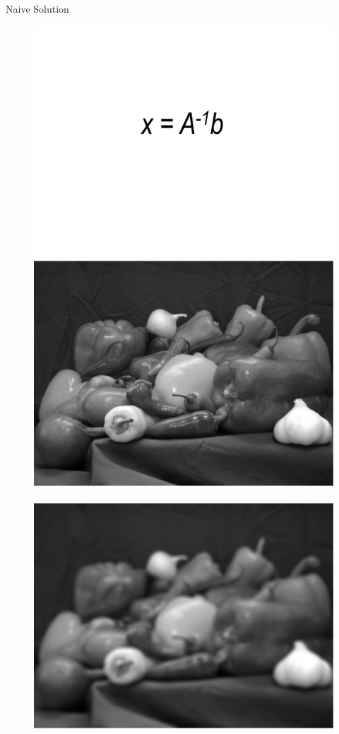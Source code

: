 \documentclass[12pt]{beamer}
\begin{document}
\begin{frame}{Naive Solution}
\begin{figure}
\centering
\includegraphics[scale=0.4]{naive1} \\[2ex]
\includegraphics[scale=0.2]{fig1} \,
\includegraphics[scale=0.2]{fig2} \,

\end{figure}
\end{frame}
\end{document}
